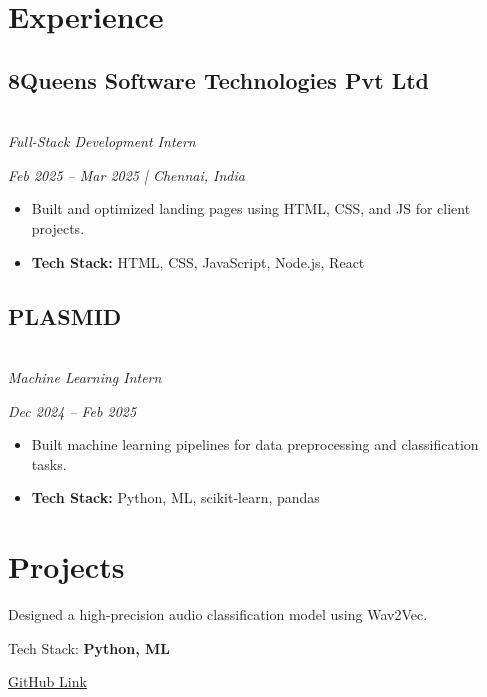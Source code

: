 \documentclass[]{deedy-resume-openfont}
\begin{document}
\hfill
\begin{minipage}[t]{0.49\textwidth} 

\section*{\textbf{Experience}}
\vspace{2pt}

\subsection{8Queens Software Technologies Pvt Ltd} \\ 
\textit{Full-Stack Development Intern}

\textit{Feb 2025 – Mar 2025 | Chennai, India} \\
\begin{itemize}
  \item Built and optimized landing pages using HTML, CSS, and JS for client projects.
  \item \textbf{Tech Stack:} HTML, CSS, JavaScript, Node.js, React
\end{itemize}

\vspace{2pt}

\subsection{PLASMID} \\
\textit{Machine Learning Intern}

\textit{Dec 2024 – Feb 2025} 
\begin{itemize}
  \item Built machine learning pipelines for data preprocessing and classification tasks.
  \item \textbf{Tech Stack:} Python, ML, scikit-learn, pandas
\end{itemize}


\section{Projects}

\vspace{4pt}
\begin{tightemize}
\item Designed a high-precision audio classification model using Wav2Vec.
\item Tech Stack: {\bf Python, ML}
\item \href{https://github.com/Dhiv08/Speech-Emotion-Analysis-Using-Self-Supervised-Learning-using-Wav2Vec-model-for-High-Precision-Audio}{GitHub Link}
\end{tightemize}
\vspace{4pt}


\end{minipage}
\end{document}
